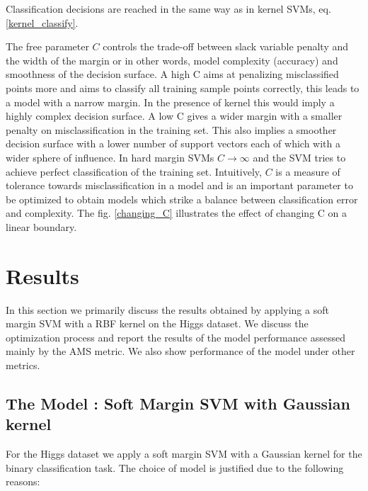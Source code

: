 \documentclass[final,3p,times,twocolumn]{elsarticle}
\begin{document}
Classification decisions are reached in the same way as in kernel SVMs, eq. \ref{kernel_classify}. 

The free parameter $C$ controls the trade-off between slack variable penalty and the width of the margin or in other words, model complexity (accuracy) and smoothness of the decision surface. A high C aims at penalizing misclassified points more and aims to classify all training sample points correctly, this leads to a model with a narrow margin. In the presence of kernel this would imply a highly complex decision surface. 
A low C gives a wider margin with a smaller penalty on misclassification in the training set. This also implies a smoother decision surface with a lower number of support vectors each of which with a wider sphere of influence. In hard margin SVMs $C \rightarrow \infty$ and the SVM tries to achieve perfect classification of the training set. Intuitively, $C$ is a measure of tolerance towards misclassification in a model and is an important parameter to be optimized to obtain models which strike a balance between classification error and complexity. The fig. \ref{changing_C} illustrates the effect of changing C on a linear boundary.  
 

\section{Results}

In this section we primarily discuss the results obtained by applying a soft margin SVM with a RBF kernel on the Higgs dataset. We discuss the optimization process and report the results of the model performance assessed mainly by the AMS metric. We also show performance of the model under other metrics. 
  
\subsection{The Model : Soft Margin SVM with Gaussian kernel}

For the Higgs dataset we apply a soft margin SVM with a Gaussian kernel for the binary classification task. The choice of model is justified due to the following reasons:
\end{document}
